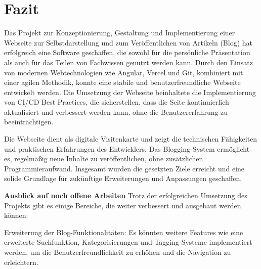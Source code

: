 \section{Fazit}
Das Projekt zur Konzeptionierung, Gestaltung und Implementierung einer Webseite zur Selbstdarstellung und zum Veröffentlichen von Artikeln (Blog) 
hat erfolgreich eine Software geschaffen, die sowohl für die persönliche Präsentation als auch für das Teilen von Fachwissen genutzt werden kann. 
Durch den Einsatz von modernen Webtechnologien wie Angular, Vercel und Git, kombiniert mit einer agilen Methodik, konnte eine stabile und 
benutzerfreundliche Webseite entwickelt werden. Die Umsetzung der Webseite beinhaltete die Implementierung von CI/CD Best Practices, 
die sicherstellen, dass die Seite kontinuierlich aktualisiert und verbessert werden kann, ohne die Benutzererfahrung zu beeinträchtigen.

Die Webseite dient als digitale Visitenkarte und zeigt die technischen Fähigkeiten und praktischen Erfahrungen des Entwicklers. 
Das Blogging-System ermöglicht es, regelmäßig neue Inhalte zu veröffentlichen, ohne zusätzlichen Programmieraufwand. 
Insgesamt wurden die gesetzten Ziele erreicht und eine solide Grundlage für zukünftige Erweiterungen und Anpassungen geschaffen.

\textbf{Ausblick auf noch offene Arbeiten}
Trotz der erfolgreichen Umsetzung des Projekts gibt es einige Bereiche, die weiter verbessert und ausgebaut werden können:

Erweiterung der Blog-Funktionalitäten: Es könnten weitere Features wie eine erweiterte Suchfunktion, Kategorisierungen und Tagging-Systeme implementiert werden, um die Benutzerfreundlichkeit zu erhöhen und die Navigation zu erleichtern.

